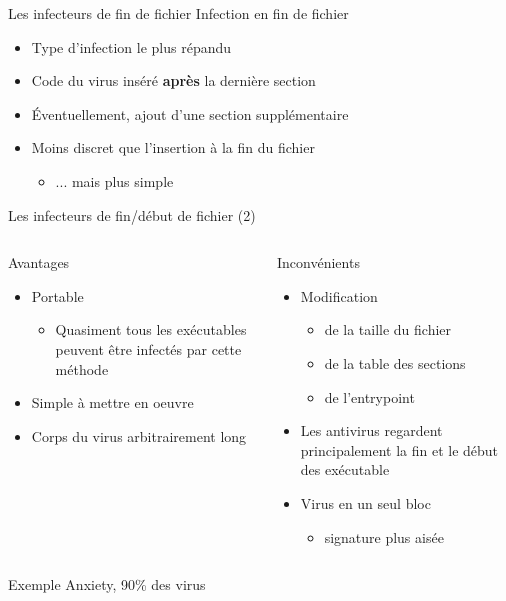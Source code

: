 \documentclass{beamer}
\begin{document}
\begin{frame}{Les infecteurs de fin de fichier}
Infection en fin de fichier
\begin{itemize}
\item Type d'infection le plus répandu
\item Code du virus inséré \textbf{après} la dernière section
\item Éventuellement, ajout d'une section supplémentaire
\item Moins discret que l'insertion à la fin du fichier
\begin{itemize}
 \item ... mais plus simple
\end{itemize}
\end{itemize}
\end{frame}


\begin{frame}{Les infecteurs de fin/début de fichier (2)}
\begin{columns}[t]
\begin{column}{5cm}
Avantages
\begin{itemize}
\item Portable
\begin{itemize}
\item Quasiment tous les exécutables peuvent être infectés par cette méthode
\end{itemize}
\item Simple à mettre en oeuvre
\item Corps du virus arbitrairement long
\end{itemize}
\end{column}
\begin{column}{5cm}
Inconvénients
\begin{itemize}
\item Modification 
\begin{itemize}
\item de la taille du fichier
\item de la table des sections
\item de l'entrypoint
\end{itemize}
\item Les antivirus regardent principalement la fin et le début des exécutable
\item Virus en un seul bloc
\begin{itemize}
\item signature plus aisée
\end{itemize}
\end{itemize}
\end{column}
\end{columns}
\begin{alertblock}{Exemple}
Anxiety, 90\% des virus
\end{alertblock}
\end{frame}
\end{document}
